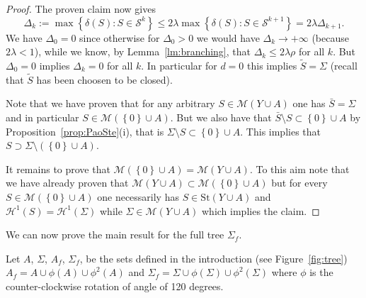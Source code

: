 \documentclass{amsart}
\renewcommand{\H}{\mathcal H}
\newcommand{\ENCLOSE}[1]{\left\{#1\right\}}
\newcommand{\St}{\mathrm{St}}
\newcommand{\M}{\mathcal{M}}
\renewcommand{\H}{\mathcal{H}}
\renewcommand{\S}{\mathcal{S}}
\theoremstyle{definition}
\theoremstyle{remark}
\begin{document}
\begin{proof}
The proven claim now gives 
\[
  \Delta_k 
  := \max\ENCLOSE{\delta(S)\colon S\in \S^k}
   \le 2\lambda \max\ENCLOSE{\delta(S)\colon S\in \S^{k+1}}
   = 2 \lambda \Delta_{k+1}.
\]
We have $\Delta_0 = 0$ since otherwise for 
$\Delta_0>0$ we would have 
$\Delta_k\to +\infty$ (because $2\lambda <1$), while we know,
by Lemma~\ref{lm:branching}, that $\Delta_k \le 2\lambda\rho$
for all $k$.
But $\Delta_0 =0$ implies $\Delta_k=0$ for all $k$.
In particular for $d=0$ this implies $\tilde S=\Sigma$ 
(recall that $\tilde S$ has been choosen to be closed).

Note that we have proven that for any arbitrary $S\in \M(Y\cup A)$ 
one has $\bar S= \Sigma$ and in particular $S\in \M(\ENCLOSE 0 \cup A)$. 
But we also have that $\bar S \setminus S \subset \ENCLOSE{0}\cup A$
by Proposition~\ref{prop:PaoSte}(i),
that is $\Sigma\setminus S \subset \ENCLOSE 0 \cup A$.
This implies that $S\supset \Sigma\setminus(\ENCLOSE 0 \cup A)$.

It remains to prove that $\M(\ENCLOSE 0 \cup A) = \M(Y\cup A)$.
To this aim note that we have already proven 
that $\M(Y\cup A) \subset \M(\ENCLOSE 0 \cup A)$
but for every $S\in \M(\ENCLOSE 0 \cup A)$ one necessarily has 
$S\in \St(Y\cup A)$ and $\H^1(S)=\H^1(\Sigma)$ while
$\Sigma \in \M(Y\cup A)$ which implies the claim.

\end{proof}

We can now prove the main result for the full tree $\Sigma_f$.

Let $A$, $\Sigma$, $A_f$, $\Sigma_f$, be the sets defined in the introduction
(see Figure~\ref{fig:tree})
$A_f = A \cup \phi(A)\cup \phi^2(A)$ and 
$\Sigma_f = \Sigma \cup \phi(\Sigma)\cup \phi^2(\Sigma)$
where $\phi$ is the counter-clockwise rotation of angle of 120 degrees.
\end{document}
